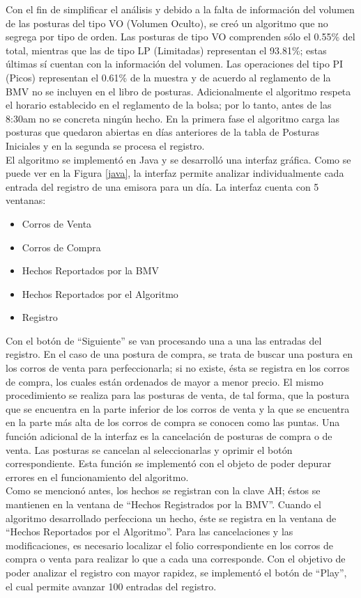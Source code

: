 \documentclass[11pt]{article}
\numberwithin{equation}{section} %
\begin{document}
Con el fin de simplificar el análisis y debido a la falta de información del volumen de las posturas del tipo VO (Volumen Oculto), se creó un algoritmo que no segrega por tipo de orden. Las posturas de tipo VO comprenden sólo el 0.55\% del total, mientras que las de tipo LP (Limitadas) representan el 93.81\%; estas últimas sí cuentan con la información del volumen. Las operaciones del tipo PI (Picos) representan el 0.61\% de la muestra y de acuerdo al reglamento de la BMV no se incluyen en el libro de posturas. Adicionalmente el algoritmo respeta el horario establecido en el reglamento de la bolsa; por lo tanto, antes de las 8:30am no se concreta ningún hecho. En la primera fase el algoritmo carga las posturas que quedaron abiertas en días anteriores de la tabla de Posturas Iniciales y en la segunda se procesa el registro.\\

El algoritmo se implementó en Java y se desarrolló una interfaz gráfica. Como se puede ver en la Figura \ref{java}, la interfaz permite analizar individualmente cada entrada del registro de una emisora para un día. La interfaz cuenta con 5 ventanas:
\begin{itemize}
  \item Corros de Venta
  \item Corros de Compra
  \item Hechos Reportados por la BMV
  \item Hechos Reportados por el Algoritmo
  \item Registro
\end{itemize}

Con el botón de ``Siguiente'' se van procesando una a una las entradas del registro. En el caso de una postura de compra, se trata de buscar una postura en los corros de venta para perfeccionarla; si no existe, ésta se registra en los corros de compra, los cuales están ordenados de mayor a menor precio. El mismo procedimiento se realiza para las posturas de venta, de tal forma, que la postura que se encuentra en la parte inferior de los corros de venta y la que se encuentra en la parte más alta de los corros de compra se conocen como las puntas. Una función adicional de la interfaz es la cancelación de posturas de compra o de venta. Las posturas se cancelan al seleccionarlas y oprimir el botón correspondiente. Esta función se implementó con el objeto de poder depurar errores en el funcionamiento del algoritmo.\\

Como se mencionó antes, los hechos se registran con la clave AH; éstos se mantienen en la ventana de ``Hechos Registrados por la BMV''. Cuando el algoritmo desarrollado perfecciona un hecho, éste se registra en la ventana de ``Hechos Reportados por el Algoritmo''. Para las cancelaciones y las modificaciones, es necesario localizar el folio correspondiente en los corros de compra o venta para realizar lo que a cada una corresponde. Con el objetivo de poder analizar el registro con mayor rapidez, se implementó el botón de ``Play'', el cual permite avanzar 100 entradas del registro.
\end{document}
